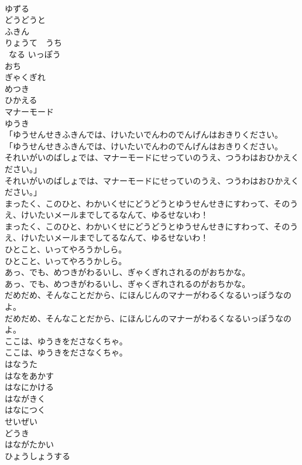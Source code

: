 \documentclass[8pt]{extreport}
\begin{document}
\begin{CJK}{UTF8}{min}
\\	ゆずる
\\	どうどうと
\\	ふきん
\\	りょうて　うち
\\	~なる いっぽう
\\	おち
\\	ぎゃくぎれ
\\	めつき
\\	ひかえる
\\	マナーモード
\\	ゆうき
\\	「ゆうせんせきふきんでは、けいたいでんわのでんげんはおきりください。
\\	「ゆうせんせきふきんでは、けいたいでんわのでんげんはおきりください。
\\	それいがいのばしょでは、マナーモードにせっていのうえ、つうわはおひかえください。」
\\	それいがいのばしょでは、マナーモードにせっていのうえ、つうわはおひかえください。」
\\	まったく、このひと、わかいくせにどうどうとゆうせんせきにすわって、そのうえ、けいたいメールまでしてるなんて、ゆるせないわ！
\\	まったく、このひと、わかいくせにどうどうとゆうせんせきにすわって、そのうえ、けいたいメールまでしてるなんて、ゆるせないわ！
\\	ひとこと、いってやろうかしら。
\\	ひとこと、いってやろうかしら。
\\	あっ、でも、めつきがわるいし、ぎゃくぎれされるのがおちかな。
\\	あっ、でも、めつきがわるいし、ぎゃくぎれされるのがおちかな。
\\	だめだめ、そんなことだから、にほんじんのマナーがわるくなるいっぽうなのよ。
\\	だめだめ、そんなことだから、にほんじんのマナーがわるくなるいっぽうなのよ。
\\	ここは、ゆうきをださなくちゃ。
\\	ここは、ゆうきをださなくちゃ。
\\	はなうた
\\	はなをあかす
\\	はなにかける
\\	はながきく
\\	はなにつく
\\	せいぜい
\\	どうき
\\	はながたかい
\\	ひょうしょうする

\end{CJK}
\end{document}
